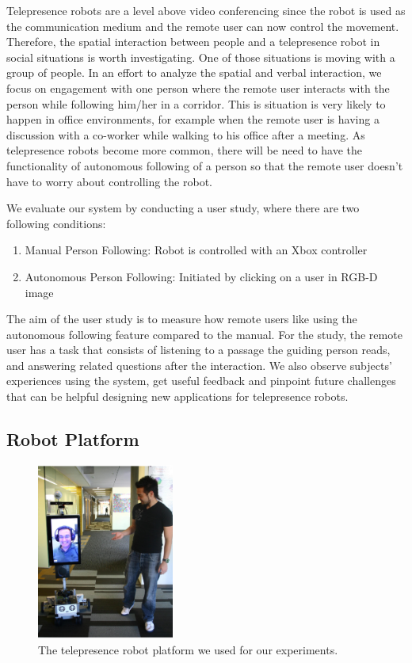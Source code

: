 Telepresence robots are a level above video conferencing since the robot is used as the communication medium and the remote user can now control the movement. Therefore, the spatial interaction between people and a telepresence robot in social situations is worth investigating. One of those situations is moving with a group of people. In an effort to analyze the spatial and verbal interaction, we focus on engagement with one person where the remote user interacts with the person while following him/her in a corridor. This is situation is very likely to happen in office environments, for example when the remote user is having a discussion with a co-worker while walking to his office after a meeting. As telepresence robots become more common, there will be need to have the functionality of autonomous following of a person so that the remote user doesn't have to worry about controlling the robot.

We evaluate our system by conducting a user study, where there are two following conditions:

\begin{enumerate}
\item Manual Person Following: Robot is controlled with an Xbox controller
\item Autonomous Person Following: Initiated by clicking on a user in RGB-D image
\end{enumerate}

The aim of the user study is to measure how remote users like using the autonomous following feature compared to the manual. For the study, the remote user has a task that consists of listening to a passage the guiding person reads, and answering related questions after the interaction. We also observe subjects' experiences using the system, get useful feedback and pinpoint future challenges that can be helpful designing new applications for telepresence robots.

\subsection{Robot Platform}

\begin{figure}[h!]
\centering
\includegraphics[width=0.4\textwidth]{pics/telepresence_robot}
\caption{The telepresence robot platform we used for our experiments.}
\label{fig:telepresence_robot}
\end{figure}

